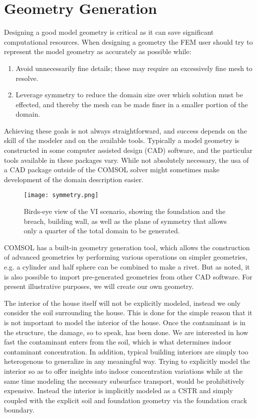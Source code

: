 \section{Geometry Generation}

Designing a good model geometry is critical as it can save significant computational resources.
When designing a geometry the FEM user should try to represent the model geometry as accurately as possible while:
\begin{enumerate}
  \item Avoid unnecessarily fine details; these may require an excessively fine mesh to resolve.
  \item Leverage symmetry to reduce the domain size over which solution must be effected, and thereby the mesh can be made finer in a smaller portion of the domain.
\end{enumerate}\par
Achieving these goals is not always straightforward, and success depends on the skill of the modeler and on the available tools.
Typically a model geometry is constructed in some computer assisted design (CAD) software, and the particular tools available in these packages vary.
While not absolutely necessary, the usa of a CAD package outside of the COMSOL solver might sometimes make development of the domain description easier.\par

\begin{figure}[htb!]
  \centering
  \texttt{[image: symmetry.png]}
  \caption{Birds-eye view of the VI scenario, showing the foundation and the breach, building wall, as well as the plane of symmetry that allows only a quarter of the total domain to be generated.}
  \label{fig:symmetry}
\end{figure}

COMSOL has a built-in geometry generation tool, which allows the construction of advanced geometries by performing various operations on simpler geometries, e.g. a cylinder and half sphere can be combined to make a rivet.
But as noted, it is also possible to import pre-generated geometries from other CAD software.
For present illustrative purposes, we will create our own geometry.\par

The interior of the house itself will not be explicitly modeled, instead we only consider the soil surrounding the house.
This is done for the simple reason that it is not important to model the interior of the house.
Once the contaminant is in the structure, the damage, so to speak, has been done.
We are interested in how fast the contaminant enters from the soil, which is what determines indoor contaminant concentration.
In addition, typical building interiors are simply too heterogenous to generalize in any meaningful way.
Trying to explicitly model the interior so as to offer insights into indoor concentration variations while at the same time modeling the necessary subsurface transport, would be prohibitively expensive.
Instead the interior is implicitly modeled as a CSTR and simply coupled with the explicit soil and foundation geometry via the foundation crack boundary.\par


